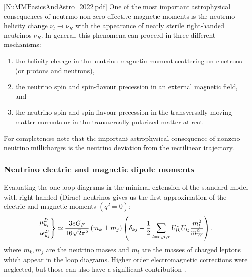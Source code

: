 [NuMMBasicsAndAstro\_2022.pdf]
One of the most important astrophysical consequences of neutrino non-zero effective magnetic moments is the neutrino helicity change $\nu_l\rightarrow\nu_R$ with the appearance of nearly sterile right-handed neutrinos $\nu_R$. In general, this phenomena can proceed in three different mechanisms:
\begin{enumerate}
\item the helicity change in the neutrino magnetic moment scattering on electrons (or protons and neutrons),
\item the neutrino spin and spin-flavour precession in an external magnetic field, and
\item the neutrino spin and spin-flavour precession in the transversally moving matter currents or in the transversally polarized matter at rest
\end{enumerate}
For completeness note that the important astrophysical consequence of nonzero neutrino millicharges is the neutrino deviation from the rectilinear trajectory.

\subsubsection{Neutrino electric and magnetic dipole moments}

Evaluating the one loop diagrams in the minimal extension of the standard model  with right handed (Dirac) neutrinos gives us the first approximation of the electric and magnetic moments $\left(q^2=0\right)$:
\begin{equation}
\begin{rcases}
\mu^D_{kj}\\
i\epsilon^D_{kj}
\end{rcases}
\simeq\frac{3eG_F}{16\sqrt{2}\pi^2}\left(m_k\pm m_j\right)\left(\delta_{kj}-\frac{1}{2}\sum_{l=e,\mu ,\tau}U^{\star}_{lk}U_{lj}\frac{m_l^2}{m_W^2}\right),
\end{equation}
where $m_k,m_j$ are the neutrino masses and $m_l$ are the masses of charged leptons which appear in the loop diagrams. Higher order electromagnetic corrections were neglected, but those can also have a significant contribution \cite{nuElmagInt2015.pdf}.

